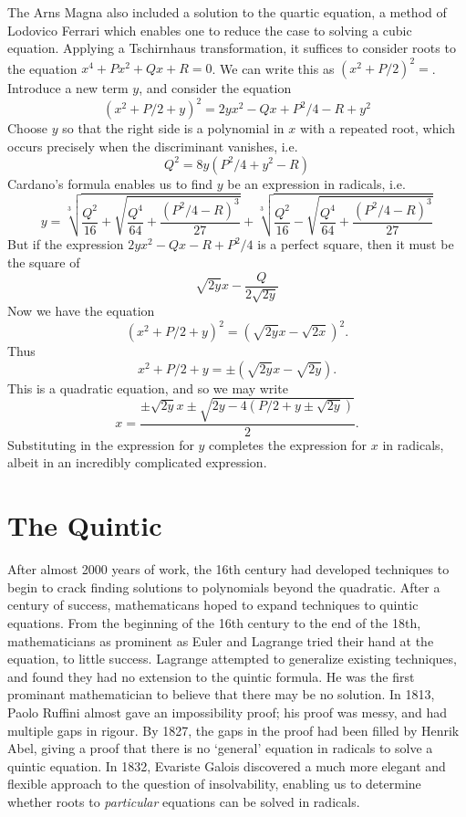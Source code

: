The Arns Magna also included a solution to the quartic equation, a method of Lodovico Ferrari which enables one to reduce the case to solving a cubic equation. Applying a Tschirnhaus transformation, it suffices to consider roots to the equation $x^4 + Px^2 + Qx + R = 0$. We can write this as $\left( x^2 + P/2 \right)^2 = $. Introduce a new term $y$, and consider the equation
%
\[ (x^2 + P/2 + y)^2 = 2yx^2 - Qx + P^2/4 - R + y^2 \]
%
Choose $y$ so that the right side is a polynomial in $x$ with a repeated root, which occurs precisely when the discriminant vanishes, i.e.
%
\[ Q^2 = 8y(P^2/4 + y^2 - R) \]
%
Cardano's formula enables us to find $y$ be an expression in radicals, i.e.
%
\[ y = \sqrt[3]{ \frac{Q^2}{16} + \sqrt{ \frac{Q^4}{64} + \frac{(P^2/4 - R)^3}{27}}} + \sqrt[3]{ \frac{Q^2}{16} - \sqrt{ \frac{Q^4}{64} + \frac{(P^2/4 - R)^3}{27}}} \]
%
But if the expression $2yx^2 -Qx - R + P^2/4$ is a perfect square, then it must be the square of
%
\[ \sqrt{2y}x - \frac{Q}{2\sqrt{2y}} \]
%
Now we have the equation
%
\[ (x^2 + P/2 + y)^2 = \left(\sqrt{2y}x - \sqrt{2x} \right)^2. \]
%
Thus
%
\[ x^2 + P/2 + y = \pm(\sqrt{2y}x - \sqrt{2y}). \]
%
This is a quadratic equation, and so we may write
\[ x = \frac{\pm \sqrt{2y} x \pm \sqrt{2y - 4(P/2 + y \pm \sqrt{2y})}}{2}. \]
%
Substituting in the expression for $y$ completes the expression for $x$ in radicals, albeit in an incredibly complicated expression.

\section{The Quintic}

After almost 2000 years of work, the 16th century had developed techniques to begin to crack finding solutions to polynomials beyond the quadratic. After a century of success, mathematicans hoped to expand techniques to quintic equations. From the beginning of the 16th century to the end of the 18th, mathematicians as prominent as Euler and Lagrange tried their hand at the equation, to little success. Lagrange attempted to generalize existing techniques, and found they had no extension to the quintic formula. He was the first prominant mathematician to believe that there may be no solution. In 1813, Paolo Ruffini almost gave an impossibility proof; his proof was messy, and had multiple gaps in rigour. By 1827, the gaps in the proof had been filled by Henrik Abel, giving a proof that there is no `general' equation in radicals to solve a quintic equation. In 1832, Evariste Galois discovered a much more elegant and flexible approach to the question of insolvability, enabling us to determine whether roots to \emph{particular} equations can be solved in radicals.

